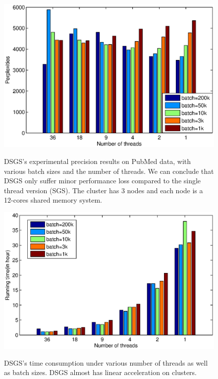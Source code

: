 \documentclass{article} %
\begin{document}
\begin{figure}
\centering
\begin{minipage}{0.45\textwidth}
\label{fig:dis_precision}
\centering
\includegraphics[width=\columnwidth]{pics/distributed_pubmed_pers.eps} 
\caption{DSGS's experimental precision results on PubMed data, with various batch sizes and the number of threads. We can conclude that DSGS only suffer minor performance loss compared to the single thread version (SGS). The cluster has 3 nodes and each node is a 12-cores shared memory system.}
\end{minipage}\hfill
\begin{minipage}{0.45\textwidth}
\label{fig:dis_time}   
\centering
\includegraphics[width=\columnwidth]{pics/distributed_pubmed_times.eps}    
\caption{DSGS's time consumption under various number of threads as well as batch sizes. DSGS almost has linear acceleration on clusters.}
\end{minipage}
\end{figure} 
\end{document}
